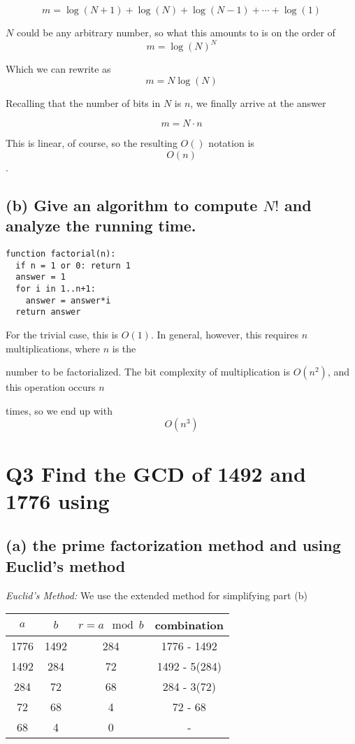 \documentclass{article}
\begin{document}
$$m = \log(N+1) + \log(N) + \log(N-1) + \cdots + \log(1)$$

$N$ could be any arbitrary number, so what this amounts to is on the order of $$m = \log(N)^N$$

Which we can rewrite as $$m = N\log(N)$$

Recalling that the number of bits in $N$ is $n$, we finally arrive at the answer

$$m = N \cdot n$$

This is linear, of course, so the resulting $O()$ notation is $$O(n)$$.

\subsection*{(b) \normalsize Give an algorithm to compute $N!$ and analyze the running time.}

\begin{lstlisting}
function factorial(n):
  if n = 1 or 0: return 1
  answer = 1
  for i in 1..n+1:
    answer = answer*i
  return answer
\end{lstlisting}

For the trivial case, this is $O(1)$. In general, however, this requires $n$ multiplications, where $n$ is the 

number to be factorialized. The bit complexity of multiplication is $O(n^2)$, and this operation occurs $n$ 

times, so we end up with $$O(n^3)$$

\bigskip

\section*{Q3 \normalsize Find the GCD of 1492 and 1776 using}

\subsection*{(a) \normalsize the prime factorization method and using Euclid's method}

\textit{Euclid's Method:} We use the extended method for simplifying part (b)

\begin{table}[h!]
  \centering
  \begin{tabular} {c c | c c}
    $a$ & $b$ & $r = a\mod b$ & combination \\ [0.5ex]
    \hline
    1776 & 1492 & 284 & 1776 - 1492 \\
    1492 & 284 & 72 & 1492 - 5(284) \\
    284 & 72 & 68 & 284 - 3(72) \\
    72 & 68 & 4 & 72 - 68 \\
    68 & 4 & 0 & - \\
  \end{tabular}
\end{table}
\end{document}
